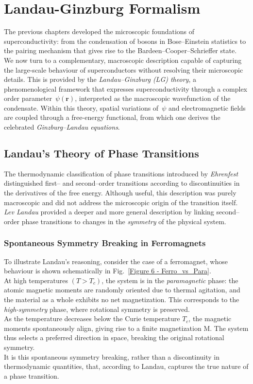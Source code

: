 \chapter{Landau-Ginzburg Formalism}%

\noindent
The previous chapters developed the microscopic foundations of superconductivity: 
from the condensation of bosons in Bose--Einstein statistics to the pairing mechanism that gives rise to the Bardeen--Cooper--Schrieffer state. \\ 
We now turn to a complementary, macroscopic description capable of capturing the large-scale behaviour of superconductors without resolving their microscopic details.  
This is provided by the \emph{Landau--Ginzburg (LG) theory}, a phenomenological framework that expresses superconductivity through a complex order parameter~$\psi(\mathbf{r})$, interpreted as the macroscopic wavefunction of the condensate. Within this theory, spatial variations of~$\psi$ and electromagnetic fields are coupled through a free-energy functional, from which one derives the celebrated \emph{Ginzburg--Landau equations}. 

\section{Landau’s Theory of Phase Transitions}
\label{sec:landau_theory}

The thermodynamic classification of phase transitions introduced by \textit{Ehrenfest} distinguished first-- and second--order transitions according to discontinuities in the derivatives of the free energy.  
Although useful, this description was purely macroscopic and did not address the microscopic origin of the transition itself.  
\textit{Lev Landau} provided a deeper and more general description by linking second--order phase transitions to changes in the \textit{symmetry} of the physical system.

\subsection*{Spontaneous Symmetry Breaking in Ferromagnets}
To illustrate Landau’s reasoning, consider the case of a ferromagnet, whose behaviour is shown schematically in Fig.~\ref{Figure 6 - Ferro_vs_Para}.\\
At high temperatures $(T > T_c)$, the system is in the \emph{paramagnetic} phase: the atomic magnetic moments are randomly oriented due to thermal agitation, and the material as a whole exhibits no net magnetization. This corresponds to the \emph{high-symmetry} phase, where rotational symmetry is preserved.\\
As the temperature decreases below the Curie temperature $T_c$, the magnetic moments spontaneously align, giving rise to a finite magnetization M. The system thus selects a preferred direction in space, breaking the original rotational symmetry.\\
It is this spontaneous symmetry breaking, rather than a discontinuity in thermodynamic quantities, that, according to Landau, captures the true nature of a phase transition.


